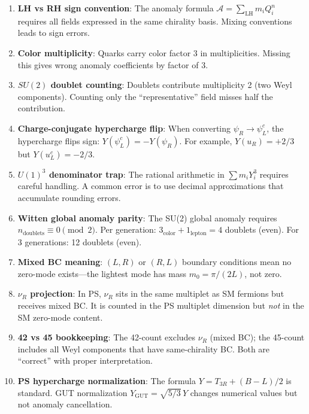 \documentclass[11pt,a4paper]{article}
\begin{document}
\begin{enumerate}[label=\textbf{T\arabic*.}, leftmargin=2cm]

\item \textbf{LH vs RH sign convention}: The anomaly formula $\mathcal{A} = \sum_{\text{LH}} m_i Q_i^n$ requires all fields expressed in the same chirality basis. Mixing conventions leads to sign errors.

\item \textbf{Color multiplicity}: Quarks carry color factor 3 in multiplicities. Missing this gives wrong anomaly coefficients by factor of 3.

\item \textbf{$SU(2)$ doublet counting}: Doublets contribute multiplicity 2 (two Weyl components). Counting only the ``representative'' field misses half the contribution.

\item \textbf{Charge-conjugate hypercharge flip}: When converting $\psi_R \to \psi^c_L$, the hypercharge flips sign: $Y(\psi^c_L) = -Y(\psi_R)$. For example, $Y(u_R) = +2/3$ but $Y(u^c_L) = -2/3$.

\item \textbf{$U(1)^3$ denominator trap}: The rational arithmetic in $\sum m_i Y_i^3$ requires careful handling. A common error is to use decimal approximations that accumulate rounding errors.

\item \textbf{Witten global anomaly parity}: The SU(2) global anomaly requires $n_{\text{doublets}} \equiv 0 \pmod{2}$. Per generation: $3_{\text{color}} + 1_{\text{lepton}} = 4$ doublets (even). For 3 generations: 12 doublets (even). \checkmark

\item \textbf{Mixed BC meaning}: $(L,R)$ or $(R,L)$ boundary conditions mean no zero-mode exists---the lightest mode has mass $m_0 = \pi/(2L)$, not zero.

\item \textbf{$\nu_R$ projection}: In PS, $\nu_R$ sits in the same multiplet as SM fermions but receives mixed BC. It is counted in the PS multiplet dimension but \textit{not} in the SM zero-mode content.

\item \textbf{42 vs 45 bookkeeping}: The 42-count excludes $\nu_R$ (mixed BC); the 45-count includes all Weyl components that have same-chirality BC. Both are ``correct'' with proper interpretation.

\item \textbf{PS hypercharge normalization}: The formula $Y = T_{3R} + (B-L)/2$ is standard. GUT normalization $Y_{\text{GUT}} = \sqrt{5/3}\, Y$ changes numerical values but not anomaly cancellation.


\end{enumerate}
\end{document}

